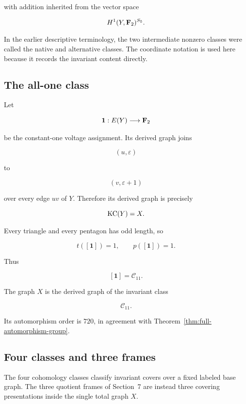 with addition inherited from the vector space

\[
H^1(Y,\mathbf F_2)^{S_5}.
\]

In the earlier descriptive terminology, the two intermediate nonzero
classes were called the native and alternative classes. The coordinate
notation is used here because it records the invariant content directly.

\subsection{The all-one class}

Let

\[
\mathbf 1:E(Y)\longrightarrow\mathbf F_2
\]

be the constant-one voltage assignment. Its derived graph joins

\[
(u,\varepsilon)
\]

to

\[
(v,\varepsilon+1)
\]

over every edge \(uv\) of \(Y\). Therefore its derived graph is precisely

\[
\operatorname{KC}(Y)=X.
\]

Every triangle and every pentagon has odd length, so

\[
t([\mathbf 1])=1,
\qquad
p([\mathbf 1])=1.
\]

Thus

\[
[\mathbf 1]=\mathcal C_{11}.
\]

\begin{proposition}
\label{prop:x-all-one-class}

The graph \(X\) is the derived graph of the invariant class

\[
\mathcal C_{11}.
\]

Its automorphism order is \(720\), in agreement with
Theorem~\ref{thm:full-automorphism-group}.
\end{proposition}

\subsection{Four classes and three frames}

The four cohomology classes classify invariant covers over a fixed labeled
base graph. The three quotient frames of Section~7 are instead three
covering presentations inside the single total graph \(X\).


